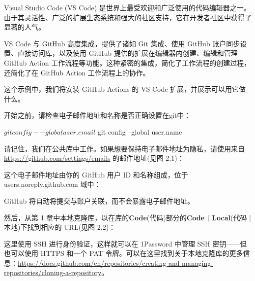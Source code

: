 
Visual Studio Code (VS Code) 是世界上最受欢迎和广泛使用的代码编辑器之一。由于其灵活性、广泛的扩展生态系统和强大的社区支持，它在开发者社区中获得了显著的人气。

VS Code 与 GitHub 高度集成，提供了诸如 Git 集成、使用 GitHub 账户同步设置、直接访问库，以及使用 GitHub 提供的扩展在编辑器内创建、编辑和管理 GitHub Action 工作流程等功能。这种紧密的集成，简化了工作流程的创建过程，还简化了在 GitHub Action 工作流程上的协作。

这个示例中，我们将安装 GitHub Actions 的 VS Code 扩展，并展示可以用它做什么。


开始之前，请检查电子邮件地址和名称是否正确设置在git中：

\begin{shell}
$ git config --global user.email
$ git config --global user.name
\end{shell}

请记住，我们在公共库中工作。如果想要保持电子邮件地址为隐私，请使用来自 \url{https://github.com/settings/emails} 的邮件地址(见图 2.1)：


这个电子邮件地址由你的 GitHub 用户 ID 和名称组成，位于 users.noreply.github.com 域中：


GitHub 将自动将提交与账户关联，而不会暴露电子邮件地址。

然后，从第 1 章中本地克隆库，以在库的\textbf{Code}(代码)部分的\textbf{Code | Local}(代码 | 本地)下找到相应的 URL(见图 2.2)：


这里使用 SSH 进行身份验证，这样就可以在 1Password 中管理 SSH 密钥——但也可以使用 HTTPS 和一个 PAT 令牌。可以在这里找到关于本地克隆库的更多信息：\url{https://docs.github.com/en/repositories/creating-and-managing-repositories/cloning-a-repository}。


